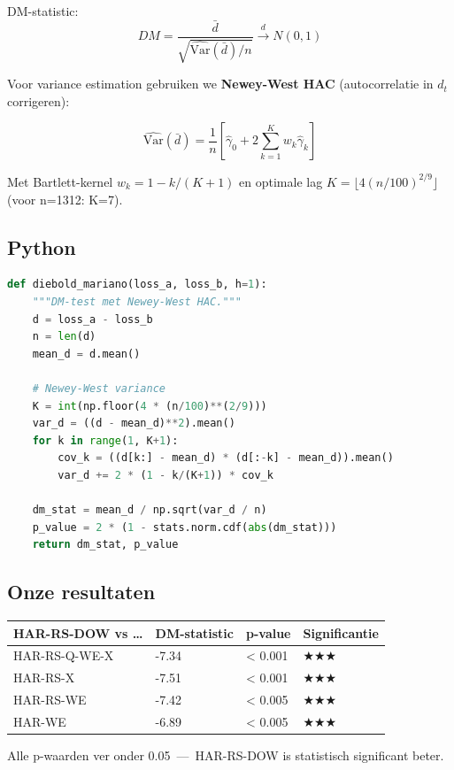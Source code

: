 \documentclass[11pt,a4paper]{article}
\begin{document}
DM-statistic:
\[DM = \frac{\bar d}{\sqrt{\widehat{\text{Var}}(\bar d)/n}} \xrightarrow{d} N(0, 1)\]

Voor variance estimation gebruiken we \textbf{Newey-West HAC} (autocorrelatie in \(d_t\) corrigeren):

\[\widehat{\text{Var}}(\bar d) = \frac{1}{n}\left[\hat\gamma_0 + 2\sum_{k=1}^{K} w_k \hat\gamma_k\right]\]

Met Bartlett-kernel \(w_k = 1 - k/(K+1)\) en optimale lag \(K = \lfloor 4(n/100)^{2/9} \rfloor\) (voor n=1312: K=7).

\hypertarget{python}{%
\subsection{Python}\label{python}}

\begin{lstlisting}[language=Python]
def diebold_mariano(loss_a, loss_b, h=1):
    """DM-test met Newey-West HAC."""
    d = loss_a - loss_b
    n = len(d)
    mean_d = d.mean()
    
    # Newey-West variance
    K = int(np.floor(4 * (n/100)**(2/9)))
    var_d = ((d - mean_d)**2).mean()
    for k in range(1, K+1):
        cov_k = ((d[k:] - mean_d) * (d[:-k] - mean_d)).mean()
        var_d += 2 * (1 - k/(K+1)) * cov_k
    
    dm_stat = mean_d / np.sqrt(var_d / n)
    p_value = 2 * (1 - stats.norm.cdf(abs(dm_stat)))
    return dm_stat, p_value
\end{lstlisting}

\hypertarget{onze-resultaten}{%
\subsection{Onze resultaten}\label{onze-resultaten}}

\begin{longtable}[]{@{}llll@{}}
\toprule
HAR-RS-DOW vs \ldots{} & DM-statistic & p-value & Significantie \\
\midrule
\endhead
HAR-RS-Q-WE-X & -7.34 & \textless{} 0.001 & ★★★ \\
HAR-RS-X & -7.51 & \textless{} 0.001 & ★★★ \\
HAR-RS-WE & -7.42 & \textless{} 0.005 & ★★★ \\
HAR-WE & -6.89 & \textless{} 0.005 & ★★★ \\
\bottomrule
\end{longtable}

Alle p-waarden ver onder 0.05 \,---\, HAR-RS-DOW is statistisch significant beter.
\end{document}
